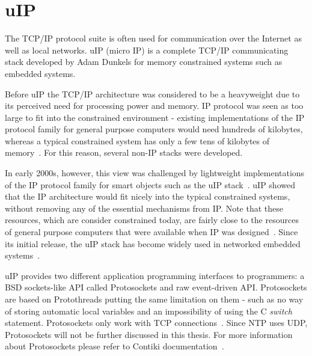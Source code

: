 
\section{uIP}\label{sec:contiki-uip}
The TCP/IP protocol suite is often used for communication over the Internet as well as local networks.
uIP (micro IP) is a complete TCP/IP communicating stack developed by Adam Dunkels
for memory constrained systems such as embedded systems.

Before uIP the TCP/IP architecture was considered to be a heavyweight
due to its perceived need for processing power and memory.
IP protocol was seen as too large to fit into the constrained environment -
existing implementations of the IP protocol family for general purpose computers would need hundreds
of kilobytes, whereas a typical constrained system has only a few tens of kilobytes of memory~\cite{interconnecting}.
For this reason, several non-IP stacks were developed.

In early 2000s, however, this view was challenged by lightweight implementations of the IP
protocol family for smart objects such as the uIP stack~\cite{interconnecting}.
uIP showed that the IP architecture would fit nicely into the typical constrained systems,
without removing any of the essential mechanisms from IP.
Note that these resources, which are consider constrained today, are fairly close to the
resources of general purpose computers that were available when IP was designed~\cite{interconnecting}.
Since its initial release, the uIP stack has become widely used in networked
embedded systems~\cite{interconnecting, thesis-programming}.

uIP provides two different application programming interfaces to programmers:
a BSD sockets-like API called Protosockets and raw event-driven API.
Protosockets are based on Protothreads putting the same limitation on them - such as 
no way of storing automatic local variables and an impossibility of using the C {\it switch} statement.
Protosockets only work with TCP connections~\cite{contiki-docs}.
Since NTP uses UDP, Protosockets will not be further
discussed in this thesis. For more information about Protosockets
please refer to Contiki documentation~\cite{contiki-docs}.

